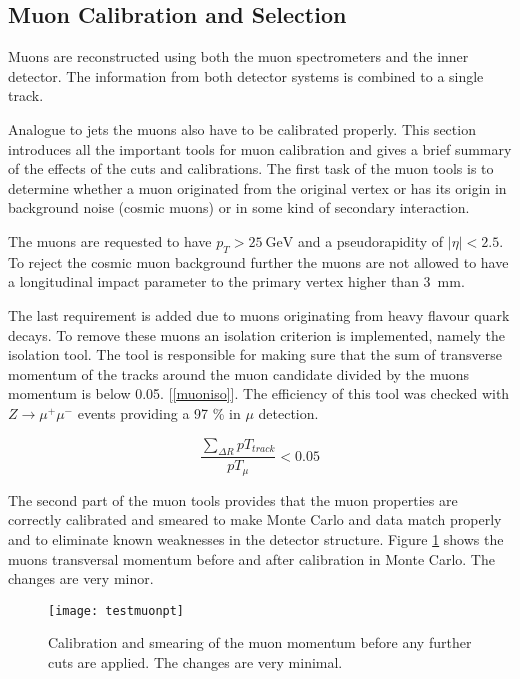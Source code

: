 \subsection{Muon Calibration and Selection}

Muons are reconstructed using both the muon spectrometers and the inner detector. The information from both detector systems is combined to a single track.

Analogue to jets the muons also have to be calibrated properly. This section introduces all the important tools for muon calibration and gives a brief summary of the effects of the cuts and calibrations.
The first task of the muon tools is to determine whether a muon originated from the original vertex or has its origin in background noise (cosmic muons) or in some kind of secondary interaction.

The muons are requested to have $p_T > \SI{25}{\GeV}$ and a pseudorapidity of $|\eta| < \num{2.5}$. To reject the cosmic muon background further the muons are not allowed to have a longitudinal impact parameter to the primary vertex higher than \SI{3}{\mm}. 

The last requirement is added due to muons originating from heavy flavour quark decays.
To remove these muons an isolation criterion is implemented, namely the isolation tool. The tool is responsible for making sure that the sum of transverse momentum of the tracks around the muon candidate divided by the muons momentum is below \num{0.05}. [\ref{muoniso}]. The efficiency of this tool was checked with $Z \rightarrow \mu^+ \mu^-$ events providing a \num{97} \% in $\mu$ detection.

\begin{equation}
\frac{\sum_{\Delta R}pT_{track}}{pT_{\mu}} < 0.05
\label{muoniso}
\end{equation}


The second part of the muon tools provides that the muon properties are correctly calibrated and smeared to make Monte Carlo and data match properly and to eliminate known weaknesses in the detector structure. Figure \ref{fig:testmuonpt} shows the muons transversal momentum before and after calibration in Monte Carlo. The changes are very minor.

\begin{figure}[h]
\centering
\texttt{[image: testmuonpt]}
\caption[Calibration and Smearing of the muon momentum]{Calibration and smearing of the muon momentum before any further cuts are applied. The changes are very minimal.}
\label{fig:testmuonpt}
\end{figure}

